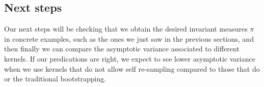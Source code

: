 \subsection{Next steps}
Our next steps will be checking that we obtain the desired invariant measures $\pi$ in concrete examples, such as the ones we just saw in the previous sections, and then finally we can compare the asymptotic variance associated to different kernels. If our predications are right, we expect to see lower asymptotic variance when we use kernels that do not allow self re-sampling compared to those that do or the traditional bootstrapping.






